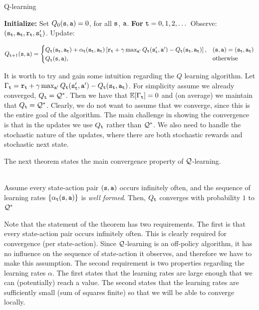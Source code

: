 \begin{algorithm}[H]
\caption{Q-learning}
\begin{algorithmic}[1]
\State \textbf{Initialize:} Set $Q_0({\tt s},{\tt a}) = 0$, for all ${\tt s}$, ${\tt a}$.
\State \textbf{For} {${\tt t} = 0, 1, 2, \dots$}
    \State \quad Observe: $({\tt s}_{\tt t}, {\tt a}_{\tt t}, {\tt r}_{\tt t}, {\tt s}_{{\tt t}}')$.
    \State \quad Update:
    \begin{small}
    \[
    Q_{{\tt t}+1}({\tt s}, {\tt a}) = \begin{cases}
        Q_{\tt t}({\tt s}_{\tt t}, {\tt a}_{\tt t}) + \alpha_{\tt t}({\tt s}_{\tt t}, {\tt a}_{\tt t}) \left[{\tt r}_{\tt t} + \gamma \max_{{\tt a}'} Q_{\tt t}({\tt s}_{{\tt t}}', {\tt a}') - Q_{\tt t}({\tt s}_{\tt t}, {\tt a}_{\tt t})\right], &  ({\tt s},{\tt a})=({\tt s}_{\tt t}, {\tt a}_{\tt t}) \\
        Q_{\tt t}({\tt s}, {\tt a}), & \textrm{otherwise}
    \end{cases}
    \]    
    \end{small}
\end{algorithmic}
\end{algorithm}


It is worth to try and gain some intuition regarding the $Q$
learning algorithm. Let $\Gamma_{\tt t}= {\tt r}_{\tt t} + \gamma
\max_{{\tt a}'} Q_{\tt t} ({\tt s}_{{\tt t}}', {\tt a}')-Q_{\tt t}
({\tt s}_{\tt t},{\tt a}_{\tt t})$.
%
For simplicity assume we already converged,
%
$Q_{\tt t}=\mathcal{Q}^*$. Then we have that $\mathbb{E}[\Gamma_{\tt t}]=0$ and (on
average) we maintain that $Q_{\tt t}=\mathcal{Q}^*$.
%
Clearly, we do not want to assume that we converge, since this is the
entire goal of the algorithm.
%
The main challenge in showing the convergence is that in the updates
we use $Q_{\tt t}$ rather than $\mathcal{Q}^*$. We also need to handle the
stochastic nature of the updates, where there are both stochastic
rewards and stochastic next state.

The next theorem states the main convergence property of
$\mathcal{Q}$-learning.
\begin{theorem}\ \\
\label{thm:Q-learning} Assume every state-action pair
$({\tt s},{\tt a})$ occurs infinitely often, and the sequence of learning rates $\{\alpha_{\tt t}({\tt s},{\tt a})\}$ is \emph{well formed}.
Then, $Q_{\tt t}$ converges with probability $1$ to $\mathcal{Q}^*$
\end{theorem}

Note that the statement of the theorem has two requirements. The
first is that every state-action pair occurs infinitely often.
This is clearly required for convergence (per state-action). Since
$\mathcal{Q}$-learning is an off-policy algorithm, it has no influence on the sequence
of state-action it observes, and therefore we have to make this
assumption. The second requirement is two properties regarding the
learning rates $\alpha$. The first states that the learning rates
are large enough that we can (potentially) reach a value. The
second states that the learning rates are sufficiently small (sum of
squares finite) so that we will be able to converge locally.

